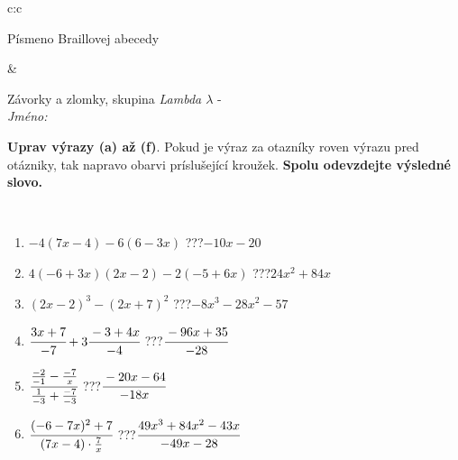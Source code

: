 \documentclass[10pt]{report}
\begin{document}
\begin{tabular}{c:c}
\begin{minipage}[c][104.5mm][t]{0.5\linewidth}
\begin{center}
\begin{minipage}{0.20\linewidth}
\begin{center}
{\small Písmeno Braillovej abecedy}
\end{center}
\end{minipage}
\end{center}
\end{minipage}
&
\begin{minipage}[c][104.5mm][t]{0.5\linewidth}
\begin{center}
\vspace{7mm}
{\huge Závorky a zlomky, skupina \textit{Lambda $\lambda$} -}\\[5mm]
\textit{Jméno:}\phantom{xxxxxxxxxxxxxxxxxxxxxxxxxxxxxxxxxxxxxxxxxxxxxxxxxxxxxxxxxxxxxxxxx}\\[5mm]
\begin{minipage}{0.95\linewidth}
\begin{center}
\textbf{Uprav výrazy (a) až (f)}. Pokud je výraz za otazníky roven výrazu pred otázniky, tak napravo obarvi príslušející kroužek. \textbf{Spolu odevzdejte výsledné slovo.}
\end{center}
\end{minipage}
\\[1mm]
\begin{minipage}{0.79\linewidth}
\begin{center}
\begin{varwidth}{\linewidth}
\begin{enumerate}
\normalsize
\item $-4(7x-4)-6(6-3x)$\quad \dotfill\; ???\;\dotfill \quad $-10x-20$
\item $4(-6+3x)(2x-2)-2(-5+6x)$\quad \dotfill\; ???\;\dotfill \quad $24x^2+84x$
\item $(2x-2)^3-(2x+7)^2$\quad \dotfill\; ???\;\dotfill \quad $-8x^3-28x^2-57$
\item $\cfrac{3x+7}{-7}+3\cfrac{-3+4x}{-4}$\quad \dotfill\; ???\;\dotfill \quad $\cfrac{-96x+35}{-28}$
\item $\cfrac{\frac{-2}{-1}-\frac{-7}{x}}{\frac{1}{-3}+\frac{-7}{-3}}$\quad \dotfill\; ???\;\dotfill \quad $\cfrac{-20x-64}{-18x}$
\item $\cfrac{(-6-7x)^2+7}{(7x-4)\cdot\frac{7}{x}}$\quad \dotfill\; ???\;\dotfill \quad $\cfrac{49x^3+84x^2-43x}{-49x-28}$
\end{enumerate}
\end{varwidth}
\end{center}
\end{minipage}
\begin{minipage}{0.20\linewidth}
\begin{center}

\end{center}
\end{minipage}
\end{center}
\end{minipage}
\end{tabular}
\end{document}

